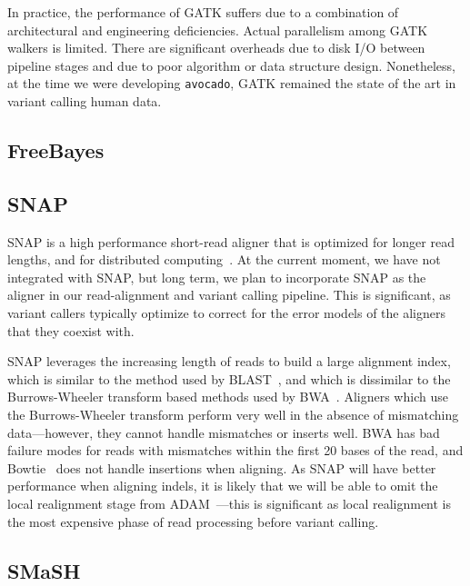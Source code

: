 \documentclass{acm_proc_article-sp}
\begin{document}
In practice, the performance of GATK suffers due to a combination of architectural
and engineering deficiencies.
Actual parallelism among GATK walkers is limited.
There are significant overheads due to disk I/O between pipeline stages and due
to poor algorithm or data structure design.
Nonetheless, at the time we were developing \texttt{avocado}, GATK remained the
state of the art in variant calling human data.

\subsection{FreeBayes}
\label{sec:freebayes}

\cite{garrison12}

\subsection{SNAP}
\label{sec:snap}


SNAP is a high performance short-read aligner that is optimized for longer read lengths, and for distributed computing~\cite{zaharia11}.
At the current moment, we have not integrated with SNAP, but long term, we plan to incorporate SNAP as the aligner in our read-alignment
and variant calling pipeline. This is significant, as variant callers typically optimize to correct for the error models of the aligners that they
coexist with.

SNAP leverages the increasing length of reads to build a large alignment index, which is similar to the method used by
BLAST~\cite{altschul90}, and which is dissimilar to the Burrows-Wheeler transform based methods used by BWA~\cite{li09bwa}. Aligners
which use the Burrows-Wheeler transform perform very well in the absence of mismatching data---however, they cannot handle mismatches
or inserts well. BWA has bad failure modes for reads with mismatches within the first 20 bases of the read, and Bowtie~\cite{langmead09}
does not handle insertions when aligning. As SNAP will have better performance when aligning indels, it is likely that we will be able to
omit the local realignment stage from ADAM~\cite{massie13}---this is significant as local realignment is the most expensive phase of
read processing before variant calling.

\subsection{SMaSH}
\label{sec:smash}
\end{document}
